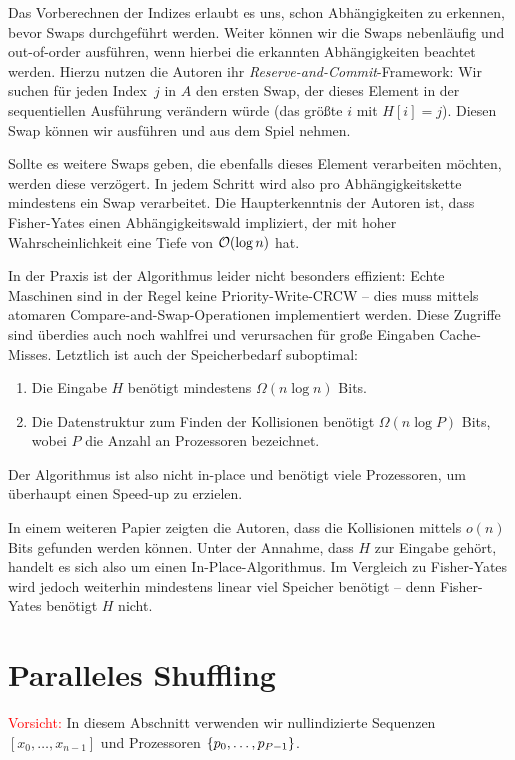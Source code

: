 Das Vorberechnen der Indizes erlaubt es uns, schon Abhängigkeiten zu erkennen, bevor Swaps durchgeführt werden.
Weiter können wir die Swaps nebenläufig und out-of-order ausführen, wenn hierbei die erkannten Abhängigkeiten beachtet werden.
Hierzu nutzen die Autoren ihr \emph{Reserve-and-Commit}-Framework:
Wir suchen für jeden Index~$j$ in $A$ den ersten Swap, der dieses Element in der sequentiellen Ausführung verändern würde (\dh das größte $i$ mit $H[i] = j$).
Diesen Swap können wir ausführen und aus dem Spiel nehmen.

Sollte es weitere Swaps geben, die ebenfalls dieses Element verarbeiten möchten, werden diese verzögert.
In jedem Schritt wird also pro Abhängigkeitskette mindestens ein Swap verarbeitet.
Die Haupterkenntnis der Autoren ist, dass Fisher-Yates einen Abhängigkeitswald impliziert, der mit hoher Wahrscheinlichkeit eine Tiefe von $\mathcal{O}\!\left(\log n\right)$ hat.

In der Praxis ist der Algorithmus leider nicht besonders effizient:
Echte Maschinen sind in der Regel keine Priority-Write-CRCW -- dies muss mittels atomaren Compare-and-Swap-Operationen implementiert werden.
Diese Zugriffe sind überdies auch noch wahlfrei und verursachen für große Eingaben Cache-Misses.
Letztlich ist auch der Speicherbedarf suboptimal:
\begin{enumerate}
    \item Die Eingabe $H$ benötigt mindestens $\Omega(n \log n)$ Bits.
    \item Die Datenstruktur zum Finden der Kollisionen benötigt $\Omega(n \log P)$ Bits, wobei $P$ die Anzahl an Prozessoren bezeichnet.
\end{enumerate}
Der Algorithmus ist also nicht in-place und benötigt viele Prozessoren, um überhaupt einen Speed-up zu erzielen.

In einem weiteren Papier zeigten die Autoren, dass die Kollisionen mittels $o(n)$ Bits gefunden werden können.
Unter der Annahme, dass $H$ zur Eingabe gehört, handelt es sich also um einen In-Place-Algorithmus.
Im Vergleich zu Fisher-Yates wird jedoch weiterhin mindestens linear viel Speicher benötigt -- denn Fisher-Yates benötigt $H$ nicht.

\section{Paralleles Shuffling}
\textcolor{red}{Vorsicht:} In diesem Abschnitt verwenden wir nullindizierte Sequenzen $[x_0, \ldots, x_{n-1}]$ und Prozessoren $\left\{p_0, \ldots, p_{P-1}\right\}$.

